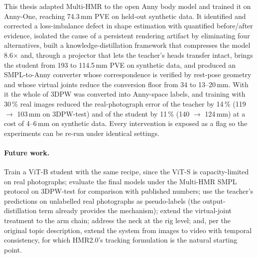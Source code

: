 This thesis adapted Multi-HMR to the open Anny body model and trained it on
Anny-One, reaching 74.3\,mm PVE on held-out synthetic data. It identified and
corrected a loss-imbalance defect in shape estimation with quantified
before/after evidence, isolated the cause of a persistent rendering artifact by
eliminating four alternatives, built a knowledge-distillation framework that
compresses the model 8.6$\times$ and, through a projector that lets the
teacher's heads transfer intact, brings the student from 193 to 114.5\,mm PVE
on synthetic data, and produced an SMPL-to-Anny converter whose
correspondence is verified by rest-pose geometry and whose virtual joints
reduce the conversion floor from 34 to 13--20\,mm. With it the whole of 3DPW
was converted into Anny-space labels, and training with 30\,\% real images
reduced the real-photograph error of the teacher by 14\,\% (119 $\rightarrow$
103\,mm on 3DPW-test) and of the student by 11\,\% (140 $\rightarrow$ 124\,mm)
at a cost of 4--6\,mm on synthetic data. Every intervention is exposed as a
flag so the experiments can be re-run under identical settings.

\paragraph{Future work.} Train a ViT-B student with the same recipe, since
the ViT-S is capacity-limited on real photographs; evaluate the final models
under the Multi-HMR SMPL protocol on 3DPW-test for comparison with published
numbers; use the teacher's predictions on unlabelled
real photographs as pseudo-labels (the output-distillation term already
provides the mechanism); extend the virtual-joint treatment to the arm chain;
address the neck at the rig level; and, per the original topic description,
extend the system from images to video with temporal consistency, for which
HMR2.0's tracking formulation is the natural starting point.

